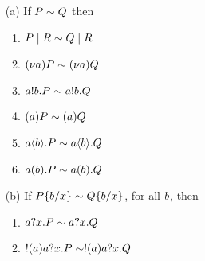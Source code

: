 \begin{theorem}\label{th:bisimlarity_is_a_congruence}
\leavevmode
\begin{itemize}
\item [(a)] If $P\sim Q$ then
\begin{enumerate}
\item $P\;|\;R \sim Q\;|\;R$
\item $(\nu a)P \sim (\nu a)Q$
\item $a!b.P \sim a!b.Q$ 
\item $(a)P \sim (a)Q$
\item $a\langle b\rangle.P \sim a\langle b\rangle.Q$
\item $a(b).P \sim a(b).Q$
\end{enumerate}
\item [(b)] If $P\{b/x\} \sim Q\{b/x\}$, for all $b$, then
\begin{enumerate}
\item $a?x.P \sim a?x.Q$
\item $!(a)a?x.P \sim !(a)a?x.Q$
\end{enumerate}
\end{itemize}
\end{theorem}

